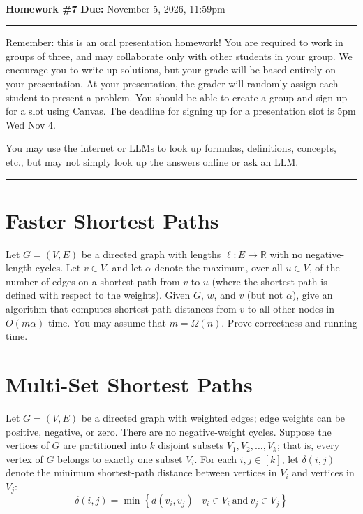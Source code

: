 \documentclass[11pt]{article}
\newcommand{\R}{\ensuremath{\mathbb R}}
\begin{document}
\\ 
{{\bf Homework \#7}} \hfill {{\bf Due:} November 5, 2026, 11:59pm} \\
\rule[0.1in]{\textwidth}{0.4pt}

Remember: this is an oral presentation homework!  You are required to work in groups of three, and may collaborate only with other students in your group.  We encourage you to write up solutions, but your grade will be based entirely on your presentation.  At your presentation, the grader will randomly assign each student to present a problem.  You should be able to create a group and sign up for a slot using Canvas.  The deadline for signing up for a presentation slot is 5pm Wed Nov 4.

You may use the internet or LLMs to look up formulas, definitions, concepts, etc., but may not simply look up the answers online or ask an LLM.  

\noindent \rule[0.1in]{\textwidth}{0.4pt}

\section{Faster Shortest Paths}

Let $G = (V, E)$ be a directed graph with lengths $\ell : E \rightarrow \R$ with no negative-length cycles.  Let $v \in V$, and let $\alpha$ denote the maximum, over all $u \in V$, of the number of edges on a shortest path from $v$ to $u$ (where the shortest-path is defined with respect to the weights).  Given $G$, $w$, and $v$ (but not $\alpha$), give an algorithm that computes shortest path distances from $v$ to all other nodes in $O(m \alpha)$ time.  You may assume that $m = \Omega(n)$.  Prove correctness and running time.



\section{Multi-Set Shortest Paths}
Let $G = (V, E)$ be a directed graph with weighted edges; edge weights can be positive, negative, or zero.  There are no negative-weight cycles.  Suppose the vertices of $G$ are partitioned into $k$ disjoint subsets $V_1, V_2, \dots, V_k$; that is, every vertex of $G$ belongs to exactly one subset $V_i$. For each $i, j \in [k]$, let $\delta(i, j)$ denote the minimum shortest-path distance between vertices in $V_i$ and vertices in $V_j$:
\[
\delta(i,j) = \min \left\{d(v_i, v_j) \mid v_i \in V_i\ \text{and}\ v_j \in V_j\right\}
\]
\end{document}
